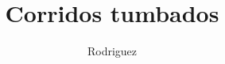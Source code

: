 \documentclass{article}
\title{Corridos tumbados}
\date{}
\author{Rodriguez}
\begin{document}
\maketitle{}
\tableofcontents

\renewcommand\guitarPreAccord{\color{amaranth}\footnotesize\strut\bfseries}

%





\end{document}

